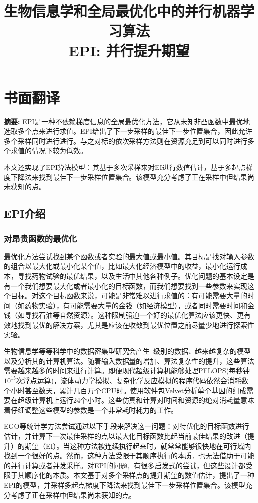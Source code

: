 \documentclass[index]{subfiles}
\begin{document}
\chapter{书面翻译}

\title{生物信息学和全局最优化中的并行机器学习算法 \\ EPI: 并行提升期望}

\textbf{摘要:}
EPI是一种不依赖梯度信息的全局最优化方法，它从未知非凸函数中最优地选取多个点来进行求值。EPI给出了下一步采样的最佳下一步位置集合，因此允许多个采样同时进行进行。与之对标的依次采样方法则在资源充足到可以同时进行多个求值的情况下较为低效。

本文还实现了EPI算法模型：其基于多次采样来对EI进行数值估计，基于多起点梯度下降法来找到最佳下一步采样位置集合。该模型充分考虑了正在采样中但结果尚未获知的点。

\section{EPI介绍} %
\label{cha:EPI Introduction}

\subsection{对昂贵函数的最优化}
最优化方法尝试找到某个函数或者实验的最大值或最小值。其目标是找对输入参数的组合以最大化或最小化某个值，比如最大化经济模型中的收益，最小化运行成本，寻找药物试验的最优结果，以及生活中其他各种例子。优化问题的基本设定是有一个我们想要最大化或者最小化的目标函数，而我们想要找到一些参数来实现这个目标。对这个目标函数来说，可能是非常难以进行求值的：有可能需要大量的时间（如药物实验），有可能需要大量的金钱（如经济模型），或者同时需要时间和金钱（如寻找石油等自然资源）。这种限制强迫一个好的最优化算法应该更快、更有效地找到最优的解决方案，尤其是应该在收敛到最优位置之前尽量少地进行探索性实验。

生物信息学等等科学中的数据密集型研究会产生\si{\peta\byte}级别的数据、越来越复杂的模型以及分析其的计算机算法。随着输入数据量的增加、算法复杂性的提升，这些算法需要越来越多的时间来进行计算。即便现代超级计算机能够处理\si{\peta FLOPS}(每秒钟$10^{15}$次浮点运算)，流体动力学模拟\cite{Compo2011}、复杂化学反应模拟\cite{Valiev2010}的程序代码依然会消耗数个小时甚至数天，累计几百万个CPU时。使用软件包Velvet\cite{Zerbino2008}分析单个基因的组成需要在超级计算机上运行24个小时。这些仿真和计算对时间和资源的绝对消耗量意味着仔细调整这些模型的参数是一个非常耗时耗力的工作。

EGO\cite{Jones1998}等统计学方法尝试通过以下手段来解决这一问题：对待优化的目标函数进行估计，并计算下一次最佳采样的点以最大化目标函数比起当前最佳结果的改进（提升）的期望（EI）。当这种方法被连续执行起来时，就常常能够很快地在可行域内找到一个很好的点。然而，这种方法受限于其顺序执行的本质，也无法借助于可能的并行计算或者并发采样。对EPI的问题，有很多启发式的尝试\cite{Ginsbourger2008}，但这些设计都受限于其顺序化的本质。本文基于对多个采样点的提升期望的数值估计，提出了一种EPI的模型，并采样多起点梯度下降法来找到最佳下一步采样位置集合。该模型充分考虑了正在采样中但结果尚未获知的点。
\end{document}
